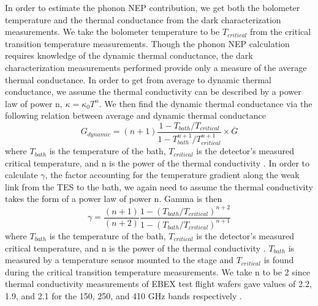 \documentclass[../EBEXPaper2.tex]{subfiles}
\begin{document}
In order to estimate the phonon \ac{NEP} contribution, we get both the bolometer temperature and the thermal conductance from the dark characterization measurements. 
We take the bolometer temperature to be $T_{critical}$ from the critical transition temperature measurements. 
Though the phonon \ac{NEP} calculation requires knowledge of the dynamic thermal conductance, the dark characterization measurements performed provide only a measure of the average thermal conductance. 
In order to get from average to dynamic thermal conductance, we assume the thermal conductivity can be described by a power law of power n, $\kappa = \kappa_{0} T^{n}$.
We then find the dynamic thermal conductance via the following relation between average and dynamic thermal conductance
\begin{equation}
G_{dynamic} = (n+1) \frac{1 - T_{bath}/T_{critical}}{1 - T_{bath}^{n+1}/T_{critical}^{n+1}} \times \overline{G}
\end{equation}
where $T_{bath}$ is the temperature of the bath, $T_{critical}$ is the detector's measured critical temperature, and n is the power of the thermal conductivity \citep{mather_appliedoptics_1982}. 
In order to calculate $\gamma$, the factor accounting for the temperature gradient along the weak link from the TES to the bath, we again need to assume the thermal conductivity takes the form of a power law of power n. 
Gamma is then
\begin{equation}
\gamma = \frac{(n+1)}{(n+2)} \frac{1 - (T_{bath}/T_{critical})^{n+2}}{1 - (T_{bath}/T_{critical})^{n+1}}
\end{equation}
where $T_{bath}$ is the temperature of the bath, $T_{critical}$ is the detector's measured critical temperature, and n is the power of the thermal conductivity \citep{mather_appliedoptics_1982}. 
$T_{bath}$ is measured by a temperature sensor mounted to the stage and $T_{critical}$ is found during the critical transition temperature measurements.
We take n to be 2 since thermal conductivity measurements of \ac{EBEX} test flight wafers gave values of  2.2, 1.9, and 2.1 for the 150, 250, and 410 GHz bands respectively \cite{hubmayr_thesis}.
\end{document}
